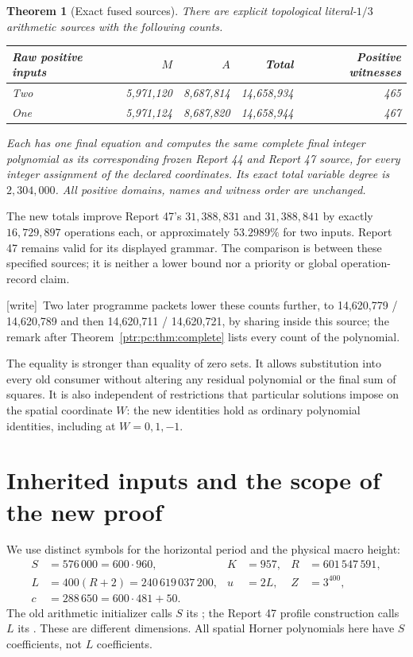 \documentclass[11pt,letterpaper]{article}
\newtheorem{theorem}{Theorem}[section]
\theoremstyle{definition}\newtheorem{definition}[theorem]{Definition}
\theoremstyle{remark}\newtheorem{remark}[theorem]{Remark}
\newcommand{\code}[1]{\texttt{\detokenize{#1}}}
\newcommand{\wtag}{\textup{[write]}}
\begin{document}
\begin{theorem}[Exact fused sources]\label{ptr:fu:thm:main}
There are explicit topological literal-$1/3$ arithmetic sources with the following counts.
\begin{center}
\begin{tabular}{@{}lrrrr@{}}\toprule
Raw positive inputs & $M$ & $A$ & Total & Positive witnesses\\\midrule
Two &5,971,120&8,687,814&14,658,934&465\\
One &5,971,124&8,687,820&14,658,944&467\\\bottomrule
\end{tabular}
\end{center}
Each has one final equation and computes the same complete final integer polynomial as its corresponding frozen Report 44 and Report 47 source, for every integer assignment of the declared coordinates. Its exact total variable degree is $2,304,000$. All positive domains, names and witness order are unchanged.
\end{theorem}
The new totals improve Report 47's $31,388,831$ and $31,388,841$ by exactly $16,729,897$ operations each, or approximately $53.2989\%$ for two inputs. Report 47 remains valid for its displayed grammar. The comparison is between these specified sources; it is neither a lower bound nor a priority or global operation-record claim.

{\small\wtag\ Two later programme packets lower these counts further, to
14,620,779 / 14,620,789 and then 14,620,711 / 14,620,721, by sharing inside
this source; the remark after Theorem~\ref{ptr:pc:thm:complete} lists every
count of the polynomial.\par}

The equality is stronger than equality of zero sets. It allows substitution into every old consumer without altering any residual polynomial or the final sum of squares. It is also independent of restrictions that particular solutions impose on the spatial coordinate $W$: the new identities hold as ordinary polynomial identities, including at $W=0,1,-1$.

\section{Inherited inputs and the scope of the new proof}\label{ptr:fu:sec:inputs}
We use distinct symbols for the horizontal period and the physical macro height:
\begin{align*}
 S&=576\,000=600\cdot960,& K&=957,& R&=601\,547\,591,\\
 L&=400(R+2)=240\,619\,037\,200,& u&=2L,& Z&=3^{400},\\
 c&=288\,650=600\cdot481+50.&&&&
\end{align*}
The old arithmetic initializer calls $S$ its \code{V}; the Report 47 profile construction calls $L$ its \code{V}. These are different dimensions. All spatial Horner polynomials here have $S$ coefficients, not $L$ coefficients.
\end{document}
